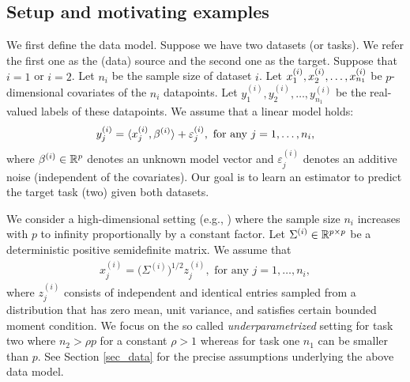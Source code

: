 \subsection{Setup and motivating examples}

We first define the data model.
Suppose we have two datasets (or tasks). We refer the first one as the (data) source and the second one as the target.
Suppose that $i = 1$ or $i = 2$.
Let $n_i$ be the sample size of dataset $i$.
Let $x_1^{(i)}, x_2^{\ss (i)}, \dots, x_{n_1}^{(i)}$ be $p$-dimensional covariates of the $n_i$ datapoints.
Let $y_1^{(i)}, y_2^{(i)}, \dots, y_{n_1}^{(i)}$ be the real-valued labels of these datapoints.
We assume that a linear model holds:
\begin{align}
    y_j^{(i)} = \inner{x_j^{(i)}}{\beta^{(i)}} + \varepsilon_j^{(i)}, \text{ for any } j = 1,\dots,n_i, \label{eq_linear}
\end{align}
where $\beta^{(i)} \in \real^p$ denotes an unknown model vector and $\varepsilon^{(i)}_j$ denotes an additive noise (independent of the covariates).
Our goal is to learn an estimator to predict the target task (two) given both datasets.

We consider a high-dimensional setting (e.g., \citet{hastie2019surprises}) where the sample size $n_i$ increases with $p$ to infinity proportionally by a constant factor.
Let $\Sigma^{(i)} \in \real^{p\times p}$ be a deterministic positive semidefinite matrix.
We assume that
\begin{align}
    x_j^{(i)} = \big(\Sigma^{(i)}\big)^{1/2} z_{j}^{(i)}, \text{ for any } j = 1,\dots,n_i, \label{eq_rvm}
\end{align}
where $z_j^{(i)}$ consists of independent and identical entries sampled from a distribution that has zero mean, unit variance, and satisfies certain bounded moment condition. 
We focus on the so called \textit{underparametrized} setting for task two where $n_2 > \rho p$ for a constant $\rho > 1$ whereas for task one $n_1$ can be smaller than $p$.
See Section \ref{sec_data} for the precise assumptions underlying the above data model.

